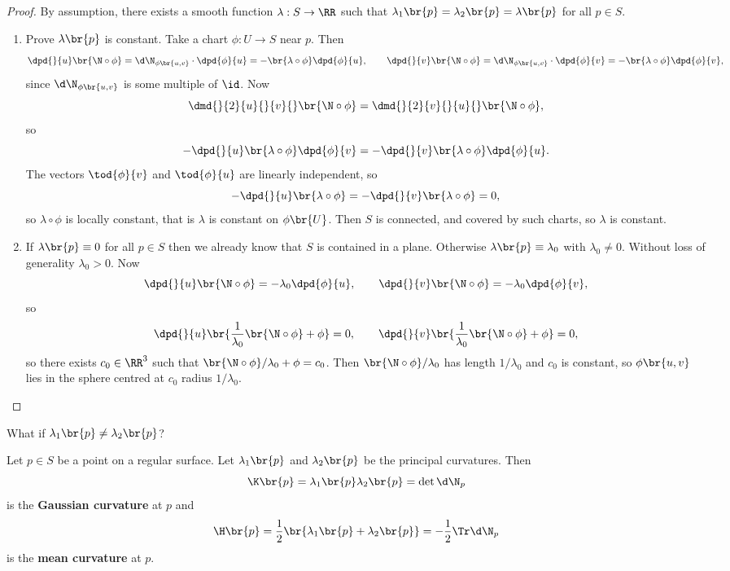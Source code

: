 
\begin{proof}
By assumption, there exists a smooth function $ \lambda : S \to \RR $ such that $ \lambda_1\br{p} = \lambda_2\br{p} = \lambda\br{p} $ for all $ p \in S $.
\begin{enumerate}[leftmargin=0.5in, label=Step \arabic*.]
\item Prove $ \lambda\br{p} $ is constant. Take a chart $ \phi : U \to S $ near $ p $. Then
$$ \dpd{}{u}\br{\N \circ \phi} = \d\N_{\phi\br{u, v}} \cdot \dpd{\phi}{u} = -\br{\lambda \circ \phi}\dpd{\phi}{u}, \qquad \dpd{}{v}\br{\N \circ \phi} = \d\N_{\phi\br{u, v}} \cdot \dpd{\phi}{v} = -\br{\lambda \circ \phi}\dpd{\phi}{v}, $$
since $ \d\N_{\phi\br{u, v}} $ is some multiple of $ \id $. Now
$$ \dmd{}{2}{u}{}{v}{}\br{\N \circ \phi} = \dmd{}{2}{v}{}{u}{}\br{\N \circ \phi}, $$
so
$$ -\dpd{}{u}\br{\lambda \circ \phi}\dpd{\phi}{v} = -\dpd{}{v}\br{\lambda \circ \phi}\dpd{\phi}{u}. $$
The vectors $ \tod{\phi}{v} $ and $ \tod{\phi}{u} $ are linearly independent, so
$$ -\dpd{}{u}\br{\lambda \circ \phi} = -\dpd{}{v}\br{\lambda \circ \phi} = 0, $$
so $ \lambda \circ \phi $ is locally constant, that is $ \lambda $ is constant on $ \phi\br{U} $. Then $ S $ is connected, and covered by such charts, so $ \lambda $ is constant.
\item If $ \lambda\br{p} \equiv 0 $ for all $ p \in S $ then we already know that $ S $ is contained in a plane. Otherwise $ \lambda\br{p} \equiv \lambda_0 $ with $ \lambda_0 \ne 0 $. Without loss of generality $ \lambda_0 > 0 $. Now
$$ \dpd{}{u}\br{\N \circ \phi} = -\lambda_0\dpd{\phi}{u}, \qquad \dpd{}{v}\br{\N \circ \phi} = -\lambda_0\dpd{\phi}{v}, $$
so
$$ \dpd{}{u}\br{\dfrac{1}{\lambda_0}\br{\N \circ \phi} + \phi} = 0, \qquad \dpd{}{v}\br{\dfrac{1}{\lambda_0}\br{\N \circ \phi} + \phi} = 0, $$
so there exists $ c_0 \in \RR^3 $ such that $ \br{\N \circ \phi} / \lambda_0 + \phi = c_0 $. Then $ \br{\N \circ \phi} / \lambda_0 $ has length $ 1 / \lambda_0 $ and $ c_0 $ is constant, so $ \phi\br{u, v} $ lies in the sphere centred at $ c_0 $ radius $ 1 / \lambda_0 $.
\end{enumerate}
\end{proof}


What if $ \lambda_1\br{p} \ne \lambda_2\br{p} $?

\begin{definition}
Let $ p \in S $ be a point on a regular surface. Let $ \lambda_1\br{p} $ and $ \lambda_2\br{p} $ be the principal curvatures. Then
$$ \K\br{p} = \lambda_1\br{p}\lambda_2\br{p} = \det \d\N_p $$
is the \textbf{Gaussian curvature} at $ p $ and
$$ \H\br{p} = \dfrac{1}{2}\br{\lambda_1\br{p} + \lambda_2\br{p}} = -\dfrac{1}{2}\Tr \d\N_p $$
is the \textbf{mean curvature} at $ p $.
\end{definition}

